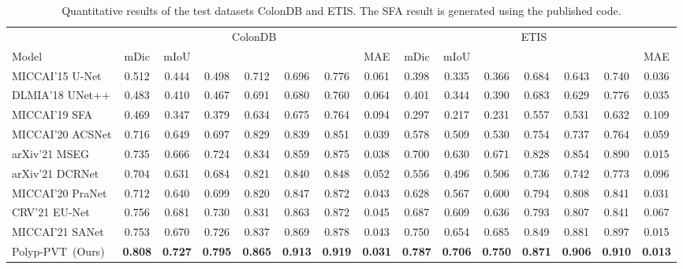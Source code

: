 \documentclass[journal]{IEEEtran}
\def\ourmodel{Polyp-PVT}
\begin{document}
\begin{table*}[t!]
\small
    \centering
    \renewcommand{\arraystretch}{1.0}
	\caption{Quantitative results of the test datasets ColonDB and ETIS. The SFA result is generated using the published code.}
	\vspace{-5pt}
    \setlength\tabcolsep{4.0pt}
    \begin{tabular}{l|ccccccc|ccccccc}
    \hline
    & \multicolumn{7}{c|}{ColonDB~\cite{tajbakhsh2015automated}}                                  & \multicolumn{7}{c}{ETIS~\cite{silva2014toward}} \\
    \cline{2-15}    
    Model & mDic & mIoU &    &     &    &  & MAE  & mDic & mIoU &    &     &   &   & MAE  \\
    \hline
    MICCAI'15 U-Net  & 0.512  & 0.444  & 0.498  & 0.712  & 0.696   & 0.776  & 0.061  & 0.398  & 0.335  & 0.366  & 0.684  & 0.643   & 0.740   & 0.036  \\
    DLMIA'18 UNet++ & 0.483  & 0.410  & 0.467  & 0.691  & 0.680    & 0.760 & 0.064   & 0.401  & 0.344  & 0.390  & 0.683  & 0.629    & 0.776 & 0.035  \\
    MICCAI'19 SFA   & 0.469  & 0.347  & 0.379  & 0.634  & 0.675   & 0.764    & 0.094 & 0.297  & 0.217  & 0.231  & 0.557  & 0.531    & 0.632  & 0.109   \\
    MICCAI'20 ACSNet & 0.716  & 0.649  & 0.697  & 0.829  & 0.839    & 0.851 & 0.039  & 0.578  & 0.509  & 0.530  & 0.754  & 0.737    & 0.764  & 0.059 \\
    arXiv'21 MSEG & 0.735  & 0.666  & 0.724  & 0.834  & 0.859    & 0.875 & 0.038   & 0.700  & 0.630  & 0.671  & 0.828  & 0.854   & 0.890  & 0.015  \\
arXiv'21 DCRNet & 0.704  & 0.631  & 0.684  & 0.821  & 0.840   & 0.848 & 0.052  & 0.556  & 0.496  & 0.506  & 0.736  & 0.742   & 0.773  & 0.096  \\
    MICCAI'20 PraNet & 0.712  & 0.640  & 0.699  & 0.820  & 0.847   & 0.872  & 0.043   & 0.628  & 0.567  & 0.600  & 0.794  & 0.808   & 0.841 & 0.031    \\
    CRV'21 EU-Net & 0.756  & 0.681  & 0.730  & 0.831  & 0.863    & 0.872 & 0.045  & 0.687  & 0.609  & 0.636  & 0.793  & 0.807    & 0.841 & 0.067 \\
    MICCAI'21 SANet & 0.753  & 0.670  & 0.726  & 0.837  & 0.869   & 0.878  & 0.043  & 0.750  & 0.654  & 0.685  & 0.849  & 0.881   & 0.897   & 0.015 \\
    \hline
    \rowcolor{gray!30}
    \ourmodel~(Ours) & \textbf{0.808} & \textbf{0.727} & \textbf{0.795} & \textbf{0.865} & \textbf{0.913} & \textbf{0.919} & \textbf{0.031}  & \textbf{0.787} & \textbf{0.706} & \textbf{0.750} & \textbf{0.871} & \textbf{0.906}  & \textbf{0.910} & \textbf{0.013} \\
    \hline
    \end{tabular}\label{tab:test1_2}
\end{table*}
\end{document}
